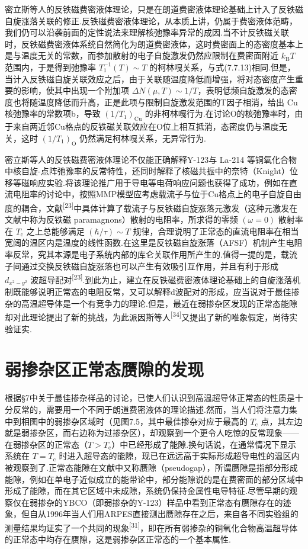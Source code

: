 密立斯等人的反铁磁费密液体理论，只是在朗道费密液体理论基础上计入了反铁磁自旋涨落关联的修正.反铁磁费密液体理论，从本质上讲，仍属于费密液体范畴，我们仍可以沿袭前面的定性说法来理解核弛豫率异常的成因.当不计反铁磁关联时，反铁磁费密液体系统自然简化为朗道费密液体，这时费密面上的态密度基本上是与温度无关的常数，而参加散射的电子自旋激发仍然应限制在费密面附近 $k_{\mathrm{B}}T$ 范围内，于是得到弛豫率 $T_{1}^{-1}(T)\sim T$ 的柯林嘎关系，与式(7.7.13)相同.但是，当计入反铁磁自旋关联效应之后，由于关联随温度降低而增强，将对态密度产生重要的影响，使其中出现一个附加项 $\Delta N\left(\mu,T\right)\sim1/T$，表明低频自旋激发的态密度也将随温度降低而升高，正是此项与限制自旋激发范围的T因子相消，给出 Cu 核弛豫率的常数项b，导致 $\left(1/T_{1}\right)_{\mathrm{Cu}}$ 的非柯林嘎行为.在讨论O的核弛豫率时，由于来自两近邻Cu格点的反铁磁关联效应在O位上相互抵消，态密度仍与温度无关，这时 $\left(1/T_{1}\right)_{\mathrm{O}}$ 仍然满足柯林嘎关系，无异常行为.

密立斯等人的反铁磁费密液体理论不仅能正确解释Y-123与 La-214 等铜氧化合物中核自旋-点阵弛豫率的反常特性，还同时解释了核磁共振中的奈特（Knight）位移等磁响应实验.将该理论推广用于导电等电荷响应问题也获得了成功，例如在直流电阻率的讨论中，按照MMP模型应考虑载流子与位于Cu格点上的电子自旋自由度的耦合，文献\textsuperscript{[23]}中具体计算了载流子与反铁磁自旋涨落元激发（这种元激发在文献中称为反铁磁 paramagnons）散射的电阻率，所求得的零频 $\left(\omega=0\right)$ 散射率在 $T_{\mathrm{c}}$ 之上总能够满足 $\left(\hbar/\tau\right)\sim T$ 规律，合理说明了正常态的直流电阻率在相当宽阔的温区内是温度的线性函数.在这里是反铁磁自旋涨落（AFSF）机制产生电阻率反常，究其本源是电子系统内部的库仑关联作用所产生的.值得一提的是，载流子间通过交换反铁磁自旋涨落也可以产生有效吸引互作用，并且有利于形成 $d_{x^{2}-y^{2}}$ 波超导配对\textsuperscript{[23]}.到此为止，建立在反铁磁费密液体理论基础上的自旋涨落机制既能够说明正常态的电阻反常，又可以解释d波配对的形成，应当说对于最佳掺杂的高温超导体是一个有竞争力的理论.但是，最近在弱掺杂区发现的正常态能隙却对此理论提出了新的挑战，为此派因斯等人\textsuperscript{[34]}又提出了新的唯象假定，尚待实验证实.

\section{弱掺杂区正常态赝隙的发现}

根据§7中关于最佳掺杂样品的讨论，已使人们认识到高温超导体正常态的性质是十分反常的，需要用一个不同于朗道费密液体的理论描述.然而，当人们将注意力集中到相图中的弱掺杂区域时（见图7.5，其中最佳掺杂对应于最高的 $T_{\mathrm{c}}$ 点，其左边就是弱掺杂区，而右边称为过掺杂区），却观察到一个更令人吃惊的反常现象——在弱掺杂区的正常态（$T>T_{\mathrm{c}}$）中已经形成了能隙.换句话说，在通常情况下显示系统在 $T=T_{\mathrm{c}}$ 时进入超导态的能隙，现已在远远高于实际形成超导电性的温区内被观察到了.正常态能隙在文献中又称赝隙（pseudogap），所谓赝隙是指部分形成能隙，例如在单电子近似成立的能带论中，部分能隙说的是在费密面的部分区域中形成了能隙，而在其它区域中未成隙，系统仍保持金属性电导特征.尽管早期的观察仅在弱掺杂的YBCO（即弱掺杂的Y-123）样品中看到正常态有赝隙存在的迹象，但自从1996年当人们用ARPES直接测出赝隙存在之后，来自各不同实验组的测量结果均证实了一个共同的现象\textsuperscript{[31]}，即在所有弱掺杂的铜氧化合物高温超导体的正常态中均存在赝隙，这是弱掺杂区正常态的一个基本属性.

